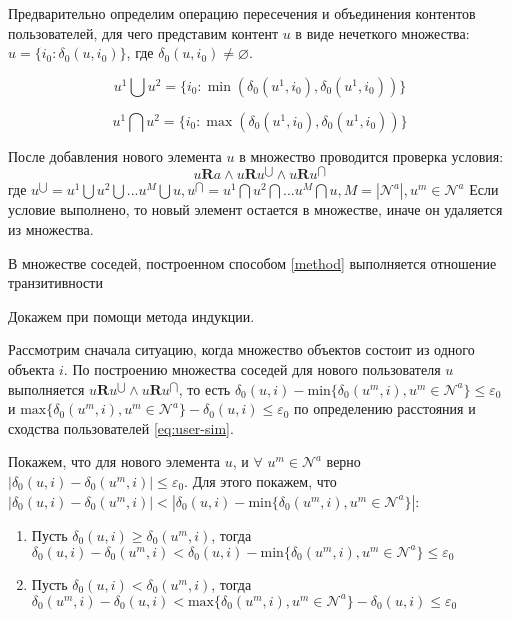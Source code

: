 Предварительно определим операцию пересечения и объединения 
контентов пользователей, для чего представим контент $u$ в виде
нечеткого множества:  $u = \{ i_0 : \delta_0(u, i_0) \}$, где $\delta_0(u, i_0) \ne \varnothing$.

\begin{equation}
u^1 \bigcup u^2 = \{ i_0 : \min(\delta_0(u^1, i_0), \delta_0(u^1, i_0)) \}
\end{equation}

\begin{equation}
u^1 \bigcap u^2 = \{ i_0 : \max(\delta_0(u^1, i_0), \delta_0(u^1, i_0)) \}
\end{equation}

После добавления нового элемента $u$ в множество проводится проверка условия:
\begin{equation}\label{method}
u \mathbf{R} a \wedge u \mathbf{R} u^{\bigcup} \wedge u \mathbf{R} u^{\bigcap}
\end{equation}
где $u^{\bigcup} = u^1 \bigcup u^2 \bigcup ... u^{M} \bigcup u, 
u^{\bigcap} = u^1 \bigcap u^2 \bigcap ... u^{M} \bigcap u, M = |\mathcal{N}^a|, u^m \in \mathcal{N}^a$
Если условие выполнено, то новый элемент остается в множестве, иначе он удаляется из множества.

\begin{assert}\label{method-assert}
В множестве соседей, построенном способом \ref{method} выполняется отношение транзитивности
\end{assert}

\begin{myproof}
Докажем при помощи метода индукции. 
\end{myproof}
Рассмотрим сначала ситуацию, когда множество объектов состоит из одного объекта $i$. По построению множества соседей  для нового пользователя $u$ 
выполняется $u \mathbf{R} u^{\bigcup} \wedge u \mathbf{R} u^{\bigcap}$, то есть
$\delta_0(u, i) - \mathrm{min}\{ \delta_0(u^m, i), u^m \in \mathcal{N}^a \} \le \varepsilon_0$ и
$\mathrm{max}\{ \delta_0(u^m, i), u^m \in \mathcal{N}^a\} - \delta_0(u, i) 
\le \varepsilon_0$ по определению расстояния и сходства пользователей \ref{eq:user-sim}.

Покажем, что для нового элемента $u$, и $\forall$ $u^m \in \mathcal{N}^a$ верно
$|\delta_0(u, i) - \delta_0(u^m, i)| \le \varepsilon_0$. Для этого покажем, что
$|\delta_0(u, i) - \delta_0(u^m, i)| < |\delta_0(u, i) - \mathrm{min}\{ \delta_0(u^m, i), u^m \in \mathcal{N}^a \}|$:

\begin{enumerate}
\item Пусть $\delta_0(u, i) \ge \delta_0(u^m, i)$, тогда \\
$\delta_0(u, i) - \delta_0(u^m, i) < \delta_0(u, i) - \mathrm{min}\{ \delta_0(u^m, i), u^m \in \mathcal{N}^a \} \le \varepsilon_0$
\item Пусть $\delta_0(u, i) < \delta_0(u^m, i)$, тогда \\
$\delta_0(u^m, i) - \delta_0(u, i) < \mathrm{max}\{ \delta_0(u^m, i), u^m \in \mathcal{N}^a \} - 
\delta_0(u, i) \le \varepsilon_0$
\end{enumerate}

